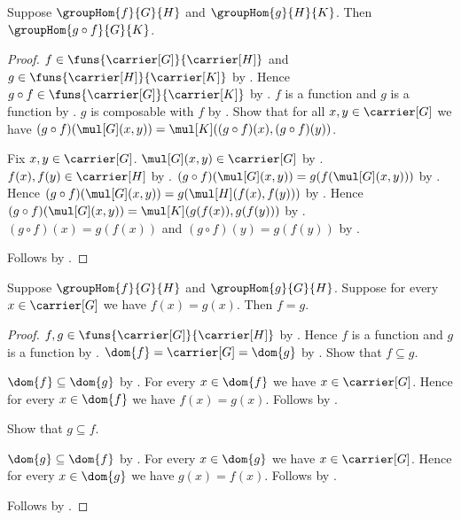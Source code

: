 \begin{theorem}\label{group_hom_composition}
    Suppose $\groupHom{f}{G}{H}$ and $\groupHom{g}{H}{K}$.
    Then $\groupHom{g\circ f}{G}{K}$.
\end{theorem}
\begin{proof}
    $f\in\funs{\carrier[G]}{\carrier[H]}$ and
        $g\in\funs{\carrier[H]}{\carrier[K]}$ by
        .
    Hence $g\circ f\in
        \funs{\carrier[G]}{\carrier[K]}$ by
        .
    $f$ is a function and $g$ is a function by
        .
    $g$ is composable with $f$ by
        .
    Show that for all $x,y\in\carrier[G]$ we have
        $(g\circ f)(\mul[G](x,y))=
            \mul[K]((g\circ f)(x),(g\circ f)(y))$.
    \begin{subproof}
        Fix $x,y\in\carrier[G]$.
        $\mul[G](x,y)\in\carrier[G]$ by
            .
        $f(x),f(y)\in\carrier[H]$ by
            .
        $(g\circ f)(\mul[G](x,y))=
            g(f(\mul[G](x,y)))$ by .
        Hence
            $(g\circ f)(\mul[G](x,y))=
                g(\mul[H](f(x),f(y)))$ by
            .
        Hence
            $(g\circ f)(\mul[G](x,y))=
                \mul[K](g(f(x)),g(f(y)))$ by
            .
        $(g\circ f)(x)=g(f(x))$ and
            $(g\circ f)(y)=g(f(y))$ by
            .
    \end{subproof}
    Follows by .
\end{proof}

\begin{theorem}\label{group_hom_extensionality}
    Suppose $\groupHom{f}{G}{H}$ and $\groupHom{g}{G}{H}$.
    Suppose for every $x\in\carrier[G]$ we have $f(x)=g(x)$.
    Then $f=g$.
\end{theorem}
\begin{proof}
    $f,g\in\funs{\carrier[G]}{\carrier[H]}$ by
        .
    Hence $f$ is a function and $g$ is a function by
        .
    $\dom{f}=\carrier[G]=\dom{g}$ by .
    Show that $f\subseteq g$.
    \begin{subproof}
        $\dom{f}\subseteq\dom{g}$ by
            .
        For every $x\in\dom{f}$ we have $x\in\carrier[G]$.
        Hence for every $x\in\dom{f}$ we have $f(x)=g(x)$.
        Follows by .
    \end{subproof}
    Show that $g\subseteq f$.
    \begin{subproof}
        $\dom{g}\subseteq\dom{f}$ by
            .
        For every $x\in\dom{g}$ we have $x\in\carrier[G]$.
        Hence for every $x\in\dom{g}$ we have $g(x)=f(x)$.
        Follows by .
    \end{subproof}
    Follows by .
\end{proof}

